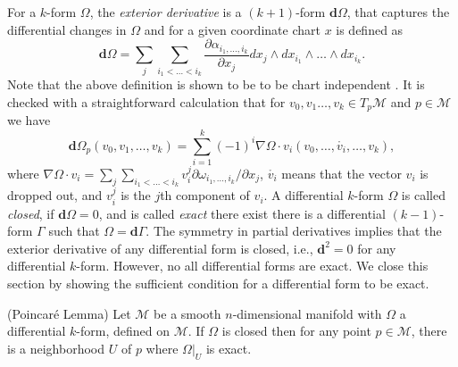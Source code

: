 For a $k$-form $\Omega$, the \emph{exterior derivative} is a $(k+1)$-form $\mathbf d \Omega$, that captures the differential changes in $\Omega$ and for a given coordinate chart $x$ is defined as
\begin{equation} \label{eq:2.13}
	\mathbf d \Omega =  \sum_j \sum_{i_1<\dots<i_k} \frac{\partial \alpha_{i_1,\dots,i_k}}{\partial x_j} dx_j\wedge dx_{i_1}\wedge\dots\wedge dx_{i_k}.
\end{equation}
Note that the above definition is shown to be to be chart independent \cite{rudin1964principles}. It is checked with a straightforward calculation that for $v_0,v_1\dots,v_k \in T_p\mathcal M$ and $p\in \mathcal M$ we have
\begin{equation} \label{eq:2.14}
	\mathbf d \Omega_p(v_0,v_1,\dots,v_k) = \sum_{i=1}^k (-1)^i \nabla \Omega \cdot v_i (v_0,\dots,\mathring{v_i},\dots,v_k), 
\end{equation}
where $\nabla \Omega \cdot v_i = \sum_j \sum_{i_1<\dots<i_k} v_i^j \partial \omega_{i_1,\dots,i_k}/\partial x_j$, $\mathring{v_i}$ means that the vector $v_i$ is dropped out, and $v_i^j$ is the $j$th component of $v_i$. A differential $k$-form $\Omega$ is called \emph{closed}, if $\mathbf d \Omega = 0$, and is called \emph{exact} there exist there is a differential $(k-1)$-form $\Gamma$ such that $\Omega = \mathbf d \Gamma$. The symmetry in partial derivatives implies that the exterior derivative of any differential form is closed, i.e., $\mathbf d^2 = 0$ for any differential $k$-form. However, no all differential forms are exact. We close this section by showing the sufficient condition for a differential form to be exact.

\begin{theorem} \label{theorem:2.4}
(Poincar\'e Lemma) Let $\mathcal M$ be a smooth $n$-dimensional manifold with $\Omega$ a differential $k$-form, defined on $\mathcal M$. If $\Omega$ is closed then for any point $p\in \mathcal M$, there is a neighborhood $U$ of $p$ where $\Omega|_{U}$ is exact.
\end{theorem}

